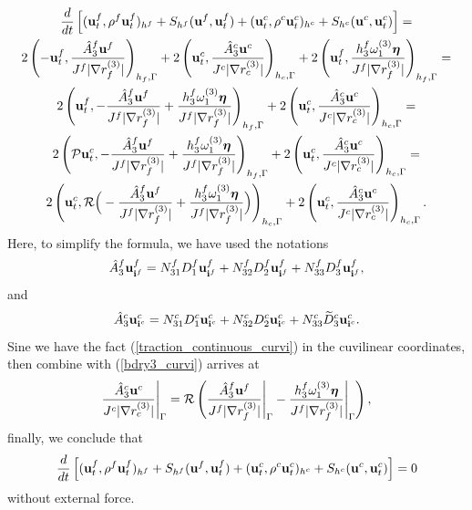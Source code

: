\documentclass[a4paper]{article}
\newcommand{\wt}{\widetilde}
\begin{document}
\begin{multline}\label{semi_energy_2}
\frac{d}{dt}\left[({\bf u}_t^f,\rho^f {\bf u}_t^f)_{h^f} + S_{h^f}({\bf u}^f,{\bf u}^f_t) + ({\bf u}_t^c,\rho^c {\bf u}_t^c)_{h^c} + S_{h^c}({\bf u}^c,{\bf u}^c_t) \right]  = \\
2\left(-{\bf u}_t^f,\frac{\hat{A}_3^f{\bf u}^f}{J^f|\nabla r_f^{(3)}|}\right)_{h_f,\Gamma} + 2\left({\bf u}_t^c,\frac{\hat{A}_3^c{\bf u}^c}{J^c|\nabla r_c^{(3)}|}\right)_{h_c,\Gamma} + 2\left({\bf u}_t^f,\frac{h_3^f\omega_1^{(3)}{\bm \eta}}{J^f|\nabla r_f^{(3)}|}\right)_{h_f,\Gamma} = \\
2\left({\bf u}_t^f,-\frac{\hat{A}_3^f{\bf u}^f}{J^f|\nabla r_f^{(3)}|} + \frac{h_3^f\omega_1^{(3)}{\bm \eta}}{J^f|\nabla r_f^{(3)}|}\right)_{h_f,\Gamma} +  2\left({\bf u}_t^c,\frac{\hat{A}_3^c{\bf u}^c}{J^c|\nabla r_c^{(3)}|}\right)_{h_c,\Gamma} = \\
2\left(\mathcal{P}{\bf u}^c_t,-\frac{\hat{A}_3^f{\bf u}^f}{J^f|\nabla r_f^{(3)}|} + \frac{h_3^f\omega_1^{(3)}{\bm \eta}}{J^f|\nabla r_f^{(3)}|}\right)_{h_f,\Gamma} + 2\left({\bf u}_t^c,\frac{\hat{A}_3^c{\bf u}^c}{J^c|\nabla r_c^{(3)}|}\right)_{h_c,\Gamma} = \\
2\left({\bf u}_t^c,\mathcal{R}\Big(-\frac{\hat{A}_3^f{\bf u}^f}{J^f|\nabla r_f^{(3)}|} + \frac{h_3^f\omega_1^{(3)}{\bm \eta}}{J^f|\nabla r_f^{(3)}|}\Big)\right)_{h_c,\Gamma} + 2\left({\bf u}_t^c,\frac{\hat{A}_3^c{\bf u}^c}{J^c|\nabla r_c^{(3)}|}\right)_{h_c,\Gamma}.
\end{multline}
Here, to simplify the formula,  we have used the notations
\begin{equation}\label{hatAf}
\hat{A}_3^f{\bf u}^f_{{\bf i}^f} = N^f_{31}D^f_1{\bf u}^f_{{\bf i}^f} + N^f_{32}D^f_2{\bf u}^f_{{\bf i}^f} + N^f_{33}D^f_3{\bf u}^f_{{\bf i}^f},
\end{equation}
and
\begin{equation}\label{hatAc}
\hat{A}_3^c{\bf u}^c_{{\bf i}^c} = N^c_{31}D^c_1{\bf u}^c_{{\bf i}^c} + N^c_{32}D^c_2{\bf u}^c_{{\bf i}^c} + N^c_{33}\wt{D}^c_3{\bf u}^c_{{\bf i}^c}.
\end{equation}
Sine we have the fact (\ref{traction_continuous_curvi}) in the cuvilinear coordinates, then combine with (\ref{bdry3_curvi}) arrives at
\begin{equation*}
\frac{\hat{A}_3^c{\bf u}^c}{J^c|\nabla r_c^{(3)}|}\Bigg|_{\Gamma} = \mathcal{R}\left(\frac{\hat{A}_3^f{\bf u}^f}{J^f|\nabla r_f^{(3)}|}\Bigg|_{\Gamma} - \frac{h_3^f\omega_1^{(3)}{\bm \eta}}{J^f|\nabla r_f^{(3)}|}\Bigg|_{\Gamma}\right),
\end{equation*}
finally, we conclude that
\begin{equation*}
\frac{d}{dt}\left[({\bf u}_t^f,\rho^f {\bf u}_t^f)_{h^f} + S_{h^f}({\bf u}^f,{\bf u}^f_t) + ({\bf u}_t^c,\rho^c {\bf u}_t^c)_{h^c} + S_{h^c}({\bf u}^c,{\bf u}^c_t) \right]  = 0
\end{equation*}
without external force.
\end{document}
